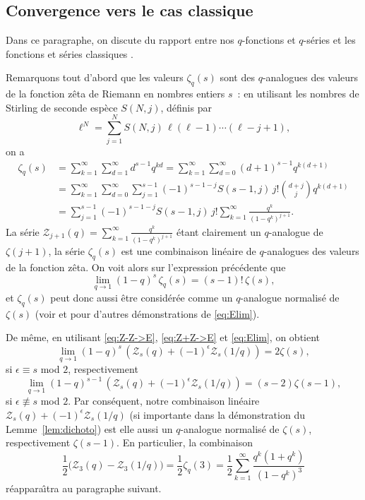 \documentclass[12pt]{amsart}
\newcommand{\ep}{\epsilon}
\theoremstyle{remark}
\numberwithin{equation}{section}
\begin{document}
\subsection{
{\og Convergence \fg} 
vers le cas {\og classique \fg}} \label{sec:class}
Dans ce paragraphe, on discute du rapport entre nos $q$-fonctions et
$q$-s{\'e}ries et les fonctions et s{\'e}ries {\og classiques \fg}.

Remarquons tout d'abord que les valeurs $\zeta_q(s)$ sont des 
$q$-analogues des valeurs de la fonction z{\^e}ta de Riemann
en nombres entiers $s$~: en utilisant les nombres de Stirling
de seconde esp{\`e}ce $S(N,j)$, d{\'e}finis par 
$$\ell^N=
\sum _{j=1} ^{N}S(N,j)\,\ell(\ell-1)\cdots(\ell-j+1),$$
on a
\begin{align*}
\zeta_q(s)&=
\sum _{k=1} ^{\infty}
\sum _{d=1} ^{\infty}d^{s-1}q^{k d}=\sum _{k=1} ^{\infty}
\sum _{d=0} ^{\infty}(d+1)^{s-1}q^{k (d+1)}\\
&=\sum _{k=1} ^{\infty}
\sum _{d=0} ^{\infty}
\sum _{j=1} ^{s-1}(-1)^{s-1-j}S(s-1,j)\,j!\binom {d+j}{j}q^{k
(d+1)}\\
&=\sum _{j=1} ^{s-1}(-1)^{s-1-j}S(s-1,j)\,j!\sum _{k=1} ^{\infty}
\frac {q^k} {(1-q^k)^{j+1}}.
\end{align*}
La s{\'e}rie $\mathcal{Z}_{j+1}(q)=\sum _{k=1} ^{\infty}
\frac {q^k} {(1-q^k)^{j+1}}$ {\'e}tant clairement un
$q$-analogue de $\zeta(j+1)$, la s{\'e}rie  $\zeta_q(s)$ est une
combinaison lin{\'e}aire de $q$-analogues des valeurs de la fonction
z{\^e}ta. On voit alors sur l'expression pr{\'e}c{\'e}dente que 
\begin{equation} \label{eq:Elim} 
\lim_{q\to1}(1-q)^s\,\zeta_q(s)=(s-1)!\,\zeta(s),
\end{equation}
et  $\zeta_q(s)$ peut donc 
aussi {\^e}tre consid{\'e}r{\'e}e comme un 
$q$-analogue normalis{\'e} de $\zeta(s)$ 
(voir \cite[Theorem~2]{jap} et \cite{zud5} pour d'autres 
d{\'e}monstrations de 
\eqref{eq:Elim}).

De m{\^e}me, en utilisant \eqref{eq:Z-Z->E}, \eqref{eq:Z+Z->E} et
\eqref{eq:Elim}, on obtient 
$$\lim_{q\to1}(1-q)^s\,(\mathcal Z_s(q)+(-1)^\ep\mathcal Z_s(1/q))
=2\zeta(s),$$
si $\ep\equiv s$ mod $2$, respectivement
$$\lim_{q\to1}(1-q)^{s-1}\,(\mathcal Z_s(q)+(-1)^\ep\mathcal Z_s(1/q))
=(s-2)\zeta(s-1),$$
si $\ep\not\equiv s$ mod $2$. Par cons{\'e}quent, notre combinaison
lin{\'e}aire $\mathcal Z_s(q)+(-1)^\ep\mathcal Z_s(1/q)$ (si
importante dans la d{\'e}monstration du Lemme~\ref{lem:dichoto}) est elle aussi 
un $q$-analogue normalis{\'e} de
$\zeta(s)$, respectivement $\zeta(s-1)$. En particulier, la combinaison
\begin{equation} \label{eq:zetaq3} 
\frac {1} {2}\bigl(\mathcal Z_3(q)-\mathcal Z_3(1/q)\bigr)=
\frac {1} {2}\zeta_q(3)=
\frac {1} {2}\sum _{k=1} ^{\infty}\frac {q^k(1+q^k)} {(1-q^k)^3}
\end{equation}
 r{\'e}appara{\^\i}tra au paragraphe suivant.
\end{document}
